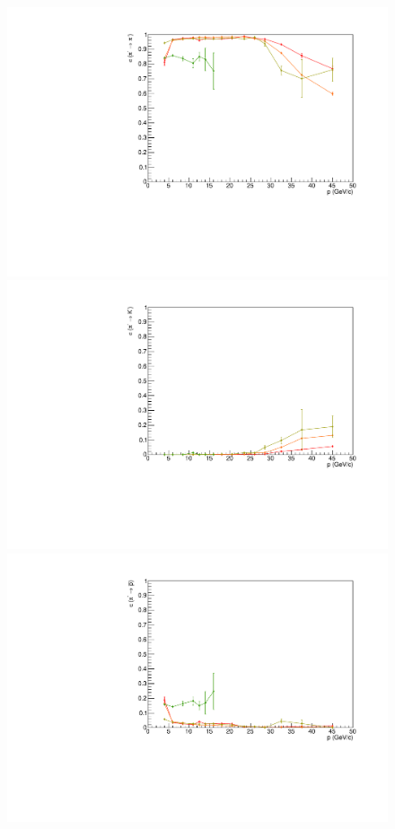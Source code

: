 \begin{figure}[!p]
  \centering
	\includegraphics[scale=0.38]{./gfx/pim_pi.pdf}
  \includegraphics[scale=0.38]{./gfx/pim_K.pdf}
  \includegraphics[scale=0.38]{./gfx/pim_p.pdf}

\end{figure}
